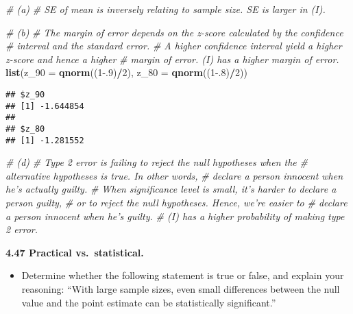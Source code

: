 \documentclass[]{book}
\newenvironment{Shaded}{\begin{snugshade}}{\end{snugshade}}
\newcommand{\CommentTok}[1]{\textcolor[rgb]{0.56,0.35,0.01}{\textit{#1}}}
\newcommand{\DataTypeTok}[1]{\textcolor[rgb]{0.13,0.29,0.53}{#1}}
\newcommand{\DecValTok}[1]{\textcolor[rgb]{0.00,0.00,0.81}{#1}}
\newcommand{\FloatTok}[1]{\textcolor[rgb]{0.00,0.00,0.81}{#1}}
\newcommand{\KeywordTok}[1]{\textcolor[rgb]{0.13,0.29,0.53}{\textbf{#1}}}
\newcommand{\NormalTok}[1]{#1}
\newcommand{\OperatorTok}[1]{\textcolor[rgb]{0.81,0.36,0.00}{\textbf{#1}}}
\providecommand{\tightlist}{%
  \setlength{\itemsep}{0pt}\setlength{\parskip}{0pt}}
\begin{document}
\begin{Shaded}
\begin{Highlighting}[]
\CommentTok{# (a)}
\CommentTok{# SE of mean is inversely relating to sample size. SE is larger in (I).}
\end{Highlighting}
\end{Shaded}

\begin{Shaded}
\begin{Highlighting}[]
\CommentTok{# (b)}
\CommentTok{# The margin of error depends on the z-score calculated by the confidence }
\CommentTok{# interval and the standard error.}
\CommentTok{# A higher confidence interval yield a higher z-score and hence a higher}
\CommentTok{# margin of error. (I) has a higher margin of error.}
\KeywordTok{list}\NormalTok{(}\DataTypeTok{z_90 =} \KeywordTok{qnorm}\NormalTok{((}\DecValTok{1}\FloatTok{-.9}\NormalTok{)}\OperatorTok{/}\DecValTok{2}\NormalTok{), }\DataTypeTok{z_80 =} \KeywordTok{qnorm}\NormalTok{((}\DecValTok{1}\FloatTok{-.8}\NormalTok{)}\OperatorTok{/}\DecValTok{2}\NormalTok{))}
\end{Highlighting}
\end{Shaded}

\begin{verbatim}
## $z_90
## [1] -1.644854
## 
## $z_80
## [1] -1.281552
\end{verbatim}

\begin{Shaded}
\begin{Highlighting}[]
\CommentTok{# (d)}
\CommentTok{# Type 2 error is failing to reject the null hypotheses when the }
\CommentTok{# alternative hypotheses is true. In other words,}
\CommentTok{# declare a person innocent when he's actually guilty.}
\CommentTok{# When significance level is small, it's harder to declare a person guilty, }
\CommentTok{# or to reject the null hypotheses. Hence, we're easier to }
\CommentTok{# declare a person innocent when he's guilty. }
\CommentTok{# (I) has a higher probability of making type 2 error.}
\end{Highlighting}
\end{Shaded}

\textbf{4.47 Practical vs.~statistical.}

\begin{itemize}
\tightlist
\item
  Determine whether the following statement is true or false, and
  explain your reasoning: ``With large sample sizes, even small differences between the null value
  and the point estimate can be statistically significant.''
\end{itemize}
\end{document}

